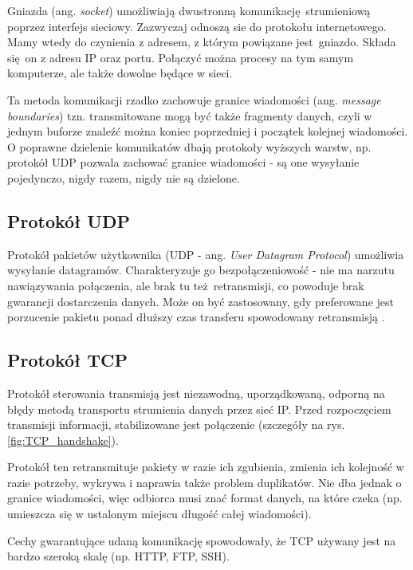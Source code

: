 Gniazda (ang. \textit{socket}) umożliwiają dwustronną komunikację strumieniową poprzez interfejs sieciowy. Zazwyczaj odnoszą sie do protokołu internetowego. Mamy wtedy do czynienia z adresem, z którym powiązane jest gniazdo. Składa się on z adresu IP oraz portu. Połączyć można procesy na tym samym komputerze, ale także dowolne będące w sieci. 

Ta metoda komunikacji rzadko zachowuje granice wiadomości (ang. \textit{message boundaries}) tzn. transmitowane mogą być także fragmenty danych, czyli w jednym buforze znaleźć można koniec poprzedniej i początek kolejnej wiadomości. O poprawne dzielenie komunikatów dbają protokoły wyższych warstw, np. protokół UDP pozwala zachować granice wiadomości - są one wysyłanie pojedynczo, nigdy razem, nigdy nie są dzielone.


\subsection{Protokół UDP}

Protokół pakietów użytkownika (UDP - ang. \textit{User Datagram Protocol}) umożliwia wysyłanie datagramów. Charakteryzuje go bezpołączeniowość - nie ma narzutu nawiązywania połączenia, ale brak tu też retransmisji, co powoduje brak gwarancji dostarczenia danych. Może on być zastosowany, gdy preferowane jest porzucenie pakietu ponad dłuższy czas transferu spowodowany retransmisją \cite{UDP_RFC}.


\subsection{Protokół TCP}
\label{TCP}

Protokół sterowania transmisją jest niezawodną, uporządkowaną, odporną na błędy metodą transportu strumienia danych przez sieć IP. Przed rozpoczęciem transmisji informacji, stabilizowane jest połączenie \cite{TCP_RFC} (szczegóły na rys. \ref{fig:TCP_handshake}).

Protokół ten retransmituje pakiety w razie ich zgubienia, zmienia ich kolejność w razie potrzeby, wykrywa i naprawia także problem duplikatów. Nie dba jednak o granice wiadomości, więc odbiorca musi znać format danych, na które czeka (np. umieszcza się w ustalonym miejscu długość całej wiadomości).

Cechy gwarantujące udaną komunikację spowodowały, że TCP używany jest na bardzo szeroką skalę (np. HTTP, FTP, SSH).

